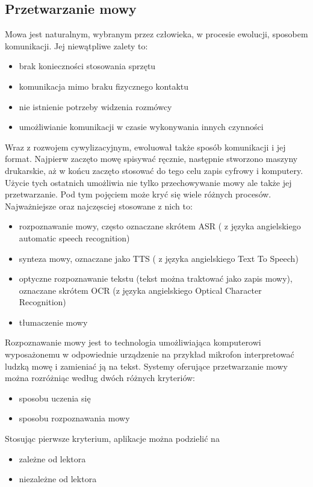 \subsection{Przetwarzanie mowy}
Mowa jest naturalnym, wybranym przez człowieka, w procesie ewolucji, sposobem komunikacji. Jej niewątpliwe zalety to:
\begin{itemize}
	\item brak konieczności stosowania sprzętu
	\item komunikacja mimo braku fizycznego kontaktu
	\item nie istnienie potrzeby widzenia rozmówcy
	\item umożliwianie komunikacji w czasie wykonywania innych czynności
\end{itemize}
Wraz z rozwojem cywylizacyjnym, ewoluował także sposób komunikacji i jej format. Najpierw zaczęto mowę spisywać ręcznie, następnie stworzono maszyny drukarskie, aż w końcu zaczęto stosować do tego celu zapis cyfrowy i komputery. Użycie tych ostatnich umożliwia nie tylko przechowywanie mowy ale także jej przetwarzanie. Pod tym pojęciem może kryć się wiele różnych procesów. Najważniejsze oraz najczęsciej stosowane z nich to:
\begin{itemize}
	\item rozpoznawanie mowy, często oznaczane skrótem ASR ( z języka angielskiego automatic speech recognition)
	\item synteza mowy, oznaczane jako TTS ( z języka angielskiego Text To Speech)
	\item optyczne rozpoznawanie tekstu (tekst można traktować jako zapis mowy), oznaczane skrótem OCR (z języka angielskiego Optical Character Recognition)
	\item tłumaczenie mowy
\end{itemize} 
Rozpoznawanie mowy jest to technologia umożliwiająca komputerowi wyposażonemu w odpowiednie urządzenie na przykład mikrofon interpretować ludzką mowę i zamieniać ją na tekst. Systemy oferujące przetwarzanie mowy można rozróżniąc według dwóch różnych kryteriów:
\begin{itemize}
	\item sposobu uczenia się
	\item sposobu rozpoznawania mowy
\end{itemize}
Stosując pierwsze kryterium, aplikacje można podzielić na
\begin{itemize}
	\item zależne od lektora
	\item niezależne od lektora
\end{itemize}
